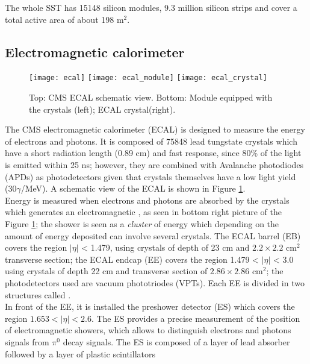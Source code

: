 \noindent The whole SST has 15148 silicon modules, 9.3 million silicon strips and cover a total active area of about 198 m$^2$. 

\subsection{Electromagnetic calorimeter}
\begin{figure}[h!]
  \centering
  \texttt{[image: ecal]}
  \texttt{[image: ecal\_module]}
  \texttt{[image: ecal\_crystal]} 
  \caption[CMS ECAL schematic view]{Top: CMS ECAL schematic view. Bottom: Module equipped with the crystals (left); ECAL crystal(right).}
  \label{fig:ecal}
\end{figure}

\noindent The CMS electromagnetic calorimeter (ECAL) is designed to measure the energy of electrons and photons. It is composed of 75848 lead tungstate crystals which have a short radiation length (0.89 cm) and fast response, since 80\% of the light is emitted within 25 ns; however, they are combined with Avalanche photodiodes (APDs) as photodetectors given that crystals themselves have a low light yield (30$\gamma$/MeV). A schematic view of the ECAL is shown in Figure \ref{fig:ecal}.\\

\noindent Energy is measured when electrons and photons are absorbed by the crystals which generates an electromagnetic , as seen in bottom right picture of the Figure \ref{fig:ecal}; the shower is seen as a \textit{cluster} of energy which depending on the amount of energy deposited can involve several crystals. The ECAL barrel (EB) covers the region $|\eta|$ < 1.479, using crystals of depth of 23 cm and  $2.2\times 2.2$ cm$^2$ transverse section; the ECAL endcap (EE) covers the region 1.479 < $|\eta|$ < 3.0 using crystals of depth 22 cm and transverse section of $2.86\times2.86$ cm$^2$; the photodetectors used are vacuum phototriodes (VPTs). Each EE is divided in two structures called .\\

\noindent In front of the EE, it is installed the preshower detector (ES) which covers the region $1.653 < |\eta| < 2.6$. The ES provides a precise measurement of the position of electromagnetic showers, which allows to distinguish electrons and photons signals from $\pi^0$ decay signals. The ES is composed of a layer of lead absorber followed by a layer of plastic scintillators

